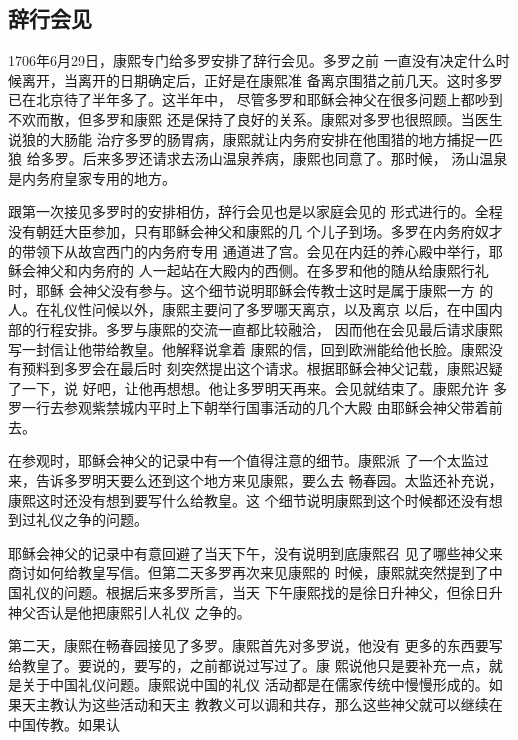 \subsection{辞行会见}
\par
1706年6月29日，康熙专门给多罗安排了辞行会见。多罗之前%
一直没有决定什么时候离开，当离开的日期确定后，正好是在康熙准%
备离京围猎之前几天。这时多罗已在北京待了半年多了。这半年中，%
尽管多罗和耶稣会神父在很多问题上都吵到不欢而散，但多罗和康熙%
还是保持了良好的关系。康熙对多罗也很照顾。当医生说狼的大肠能%
治疗多罗的肠胃病，康熙就让内务府安排在他围猎的地方捕捉一匹狼%
给多罗。后来多罗还请求去汤山温泉养病，康熙也同意了。那时候，%
汤山温泉是内务府皇家专用的地方。%
\par
跟第一次接见多罗时的安排相仿，辞行会见也是以家庭会见的%
形式进行的。全程没有朝廷大臣参加，只有耶稣会神父和康熙的几%
个儿子到场。多罗在内务府奴才的带领下从故宫西门的内务府专用%
通道进了宫。会见在内廷的养心殿中举行，耶稣会神父和内务府的%
人一起站在大殿内的西侧。在多罗和他的随从给康熙行礼时，耶稣%
会神父没有参与。这个细节说明耶稣会传教士这时是属于康熙一方%
的人。在礼仪性问候以外，康熙主要问了多罗哪天离京，以及离京%
以后，在中国内部的行程安排。多罗与康熙的交流一直都比较融洽，%
因而他在会见最后请求康熙写一封信让他带给教皇。他解释说拿着%
康熙的信，回到欧洲能给他长脸。康熙没有预料到多罗会在最后时%
刻突然提出这个请求。根据耶稣会神父记载，康熙迟疑了一下，说%
好吧，让他再想想。他让多罗明天再来。会见就结束了。康熙允许%
多罗一行去参观紫禁城内平时上下朝举行国事活动的几个大殿%
由耶稣会神父带着前去。%
\par
在参观时，耶稣会神父的记录中有一个值得注意的细节。康熙派%
了一个太监过来，告诉多罗明天要么还到这个地方来见康熙，要么去%
畅春园。太监还补充说，康熙这时还没有想到要写什么给教皇。这%
个细节说明康熙到这个时候都还没有想到过礼仪之争的问题。%
\par
耶稣会神父的记录中有意回避了当天下午，没有说明到底康熙召%
见了哪些神父来商讨如何给教皇写信。但第二天多罗再次来见康熙的%
时候，康熙就突然提到了中国礼仪的问题。根据后来多罗所言，当天%
下午康熙找的是徐日升神父，但徐日升神父否认是他把康熙引人礼仪%
之争的。%
\par
第二天，康熙在畅春园接见了多罗。康熙首先对多罗说，他没有%
更多的东西要写给教皇了。要说的，要写的，之前都说过写过了。康%
熙说他只是要补充一点，就是关于中国礼仪问题。康熙说中国的礼仪%
活动都是在儒家传统中慢慢形成的。如果天主教认为这些活动和天主%
教教义可以调和共存，那么这些神父就可以继续在中国传教。如果认%
